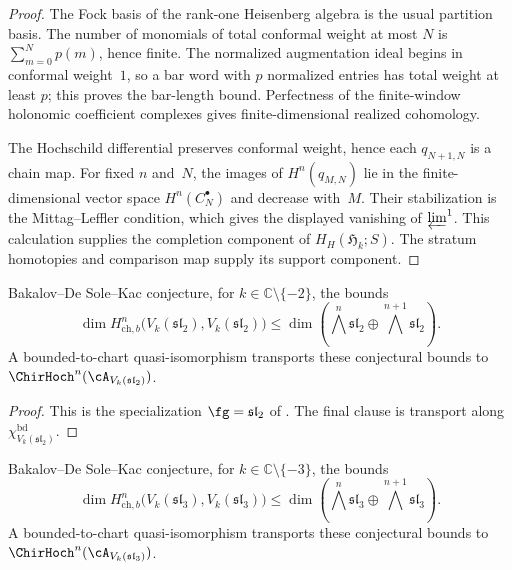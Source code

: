 \begin{proof}
The Fock basis of the rank-one Heisenberg algebra is the usual
partition basis.  The number of monomials of total conformal weight at
most \(N\) is \(\sum_{m=0}^{N}p(m)\), hence finite.  The normalized
augmentation ideal begins in conformal weight~$1$, so a bar word with
\(p\) normalized entries has total weight at least \(p\); this proves
the bar-length bound.  Perfectness of the finite-window holonomic
coefficient complexes gives finite-dimensional realized cohomology.

The Hochschild differential preserves conformal weight, hence each
$q_{N+1,N}$ is a chain map.  For fixed $n$ and~$N$, the images of
$H^n(q_{M,N})$ lie in the finite-dimensional vector space
$H^n(C_N^\bullet)$ and decrease with~$M$.  Their stabilization is the
Mittag--Leffler condition, which gives the displayed vanishing of
$\varprojlim^1$.  This calculation supplies the completion component
of \(H_H(\mathfrak H_k;S)\).  The stratum homotopies and comparison
map supply its support component.
\end{proof}

\begin{corollary}
\label{cor:chirhoch-affine-sl2}
Bakalov--De Sole--Kac conjecture, for
\(k\in\mathbb C\setminus\{-2\}\), the bounds
\[
 \dim H^n_{\mathrm{ch},b}
 \bigl(V_k(\mathfrak{sl}_2),V_k(\mathfrak{sl}_2)\bigr)
 \leq
 \dim\!\left(
 \bigwedge^n\mathfrak{sl}_2\oplus
 \bigwedge^{n+1}\mathfrak{sl}_2
 \right).
\]
A bounded-to-chart quasi-isomorphism transports these conjectural
bounds to \(\ChirHoch^n(\cA_{V_k(\mathfrak{sl}_2)})\).
\end{corollary}

\begin{proof}
This is the specialization \(\fg=\mathfrak{sl}_2\) of
\cite[Conjecture~7.5]{BDSK21}.  The final clause is transport along
\(\chi_{V_k(\mathfrak{sl}_2)}^{\mathrm{bd}}\).
\end{proof}

\begin{corollary}
\label{cor:chirhoch-affine-sl3}
Bakalov--De Sole--Kac conjecture, for
\(k\in\mathbb C\setminus\{-3\}\), the bounds
\[
 \dim H^n_{\mathrm{ch},b}
 \bigl(V_k(\mathfrak{sl}_3),V_k(\mathfrak{sl}_3)\bigr)
 \leq
 \dim\!\left(
 \bigwedge^n\mathfrak{sl}_3\oplus
 \bigwedge^{n+1}\mathfrak{sl}_3
 \right).
\]
A bounded-to-chart quasi-isomorphism transports these conjectural
bounds to \(\ChirHoch^n(\cA_{V_k(\mathfrak{sl}_3)})\).
\end{corollary}

